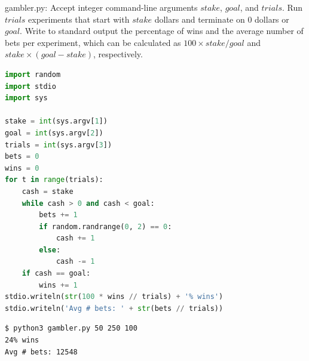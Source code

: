 \documentclass[8pt,a4paper,compress]{beamer}
\begin{document}
\begin{frame}[fragile]
\pause

\begin{framed}
\tiny gambler.py: Accept integer command-line arguments $stake$, $goal$, and $trials$. Run $trials$ experiments that start with $stake$ dollars and terminate on 0 dollars or $goal$. Write to standard output the percentage of wins and the average number of bets per experiment, which can be calculated as $100 \times stake / goal$ and $stake \times (goal - stake)$, respectively.
\end{framed}

\begin{minipage}{200pt}
\begin{lstlisting}[language=Python,style=focusin]
import random
import stdio
import sys

stake = int(sys.argv[1])
goal = int(sys.argv[2])
trials = int(sys.argv[3])
bets = 0
wins = 0
for t in range(trials):
    cash = stake
    while cash > 0 and cash < goal:
        bets += 1
        if random.randrange(0, 2) == 0:
            cash += 1
        else:
            cash -= 1
    if cash == goal:
        wins += 1
stdio.writeln(str(100 * wins // trials) + '% wins')
stdio.writeln('Avg # bets: ' + str(bets // trials))
\end{lstlisting}
\end{minipage}%
\begin{minipage}{100pt}
\hfill {}
\end{minipage}

\pause\bigskip

\begin{lstlisting}[language={},style=focusin]
$ python3 gambler.py 50 250 100
24% wins
Avg # bets: 12548
\end{lstlisting}
\end{frame}
\end{document}
